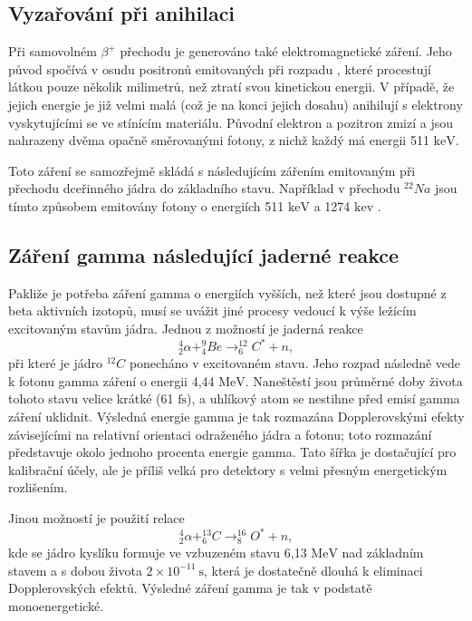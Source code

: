 \documentclass[../../main.tex]{subfiles}
\begin{document}
\subsection{Vyzařování při anihilaci}

Při samovolném $\beta^+$ přechodu je generováno také elektromagnetické záření. Jeho původ spočívá v osudu positronů emitovaných při rozpadu , které procestují látkou pouze několik milimetrů, než ztratí svou kinetickou energii. V případě, že jejich energie je již velmi malá (což je na konci jejich dosahu) anihilují s elektrony vyskytujícími se ve stínícím materiálu. Původní elektron a pozitron zmizí a jsou nahrazeny dvěma opačně směrovanými fotony, z nichž každý má energii 511 $\mathrm{keV}$.

Toto záření se samozřejmě skládá s následujícím zářením emitovaným při přechodu dceřinného jádra do základního stavu. Například v přechodu $^{22}Na$ jsou tímto způsobem emitovány fotony o energiích 511 $\mathrm{keV}$ a 1274 $\mathrm{kev}$ .

\subsection{Záření gamma následující jaderné reakce}

Pakliže je potřeba záření gamma o energiích vyšších, než které jsou dostupné z beta aktivních izotopů, musí se uvážit jiné procesy vedoucí k výše ležícím excitovaným stavům jádra. Jednou z možností je jaderná reakce
\begin{equation}
^{4}_{2}\alpha + ^{9}_{4}Be \rightarrow ^{12}_{6}C^* + n,
\end{equation}
při které je jádro $^{12}C$ ponecháno v excitovaném stavu. Jeho rozpad následně vede k fotonu gamma záření o energii 4,44 $\mathrm{MeV}.$ Naneštěstí jsou průměrné doby života tohoto stavu velice krátké (61 $\mathrm{fs}$), a uhlíkový atom se nestihne před emisí gamma záření uklidnit. Výsledná energie gamma je tak rozmazána Dopplerovskými efekty závisejícími na relativní orientaci odraženého jádra a fotonu; toto rozmazání představuje okolo jednoho procenta energie gamma. Tato šířka je dostačující pro kalibrační účely, ale je příliš velká pro detektory s velmi přesným energetickým rozlišením.

Jinou možností je použití relace
\begin{equation}
^{4}_{2}\alpha + ^{13}_{6}C \rightarrow ^{16}_{8}O^* + n,
\end{equation}
kde se jádro kyslíku formuje ve vzbuzeném stavu 6,13 $\mathrm{MeV}$ nad základním stavem a s dobou života $2\times10^{-11} ~\mathrm{s}$, která je dostatečně dlouhá k eliminaci Dopplerovských efektů. Výsledné záření gamma je tak v podstatě monoenergetické. 
\end{document}
